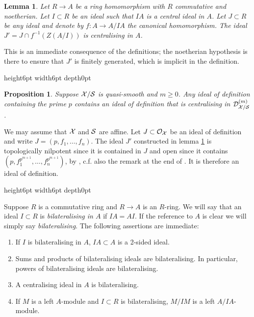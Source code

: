 \documentclass{article}
\theoremstyle{change}
\newtheorem{prop}[subsubsection]{Proposition}
\newtheorem{lemma}[subsubsection]{Lemma}
\numberwithin{equation}{subsubsection}
\newcommand{\demobox}{\vrule height6pt width6pt depth0pt}
\newenvironment{demo}{\noindent{\it Proof.}}
{{\unskip\nobreak\hfil\qquad
\demobox\parfillskip=0pt\par}
\medskip}
\begin{document}
\begin{lemma}\label{lemma:constructing-centralising-ideals}
  Let $R\to A$ be a ring homomorphism with $R$ commutative and
  noetherian. Let $I\subset R$ be an ideal such that $IA$ is a central
  ideal in $A$. Let $J\subset R$ be any ideal and denote by $f:A\to
  A/IA$ the canonical homomorphism. The ideal $J'=J\cap
  f^{-1}(Z(A/I))$ is centralising in $A$.
\end{lemma}
\begin{demo}
  This is an immediate consequence of the definitions; the noetherian
  hypothesis is there to ensure that $J'$ is finitely generated, which
  is implicit in the definition.
\end{demo}

\begin{prop}\label{prop:existence-of-centralising-ideals}
  Suppose ${\cal X}/{\cal S}$ is quasi-smooth and $m\ge0$. Any ideal of
  definition containing the prime $p$ contains an ideal of definition
  that is centralising in ${{\cal D}}^{({m})}_{{\cal X}/{\cal S}}$.
\end{prop}
\begin{demo}
  We may assume that ${\cal X}$ and ${\cal S}$ are affine. Let $J\subset{\cal O}_{\cal X}$
  be an ideal of definition and write $J=(p,f_1,\ldots,f_n)$. The
  ideal $J'$ constructed in lemma
  \ref{lemma:constructing-centralising-ideals} is topologically
  nilpotent since it is contained in $J$ and open since it contains
  $(p,f_1^{p^{m+1}},\ldots,f_n^{p^{m+1}})$, by
  \cite[prop. 2.2.6]{berthelot:1996}, c.f. also the remark at the end
  of \cite[\S3.2.3]{berthelot:1996}. It is therefore an ideal of
  definition. 
\end{demo}

Suppose $R$ is a commutative ring and $R\to A$ is an $R$-ring. We will
say that an ideal $I\subset R$ is \textit{bilateralising in $A$} if
$IA=AI$. If the reference to $A$ is clear we will simply say
\textit{bilateralising}. The following assertions are immediate:
\begin{enumerate}
\item If $I$ is bilateralising in $A$, $IA\subset A$ is a 2-sided ideal.
\item Sums and products of bilateralising ideals are
  bilateralising. In particular, powers of bilateralising ideals are
  bilateralising. 
\item A centralising ideal in $A$ is bilateralising.
\item If $M$ is a left $A$-module and $I\subset R$ is bilateralising,
  $M/IM$ is a left $A/IA$-module.
\end{enumerate}
\end{document}
